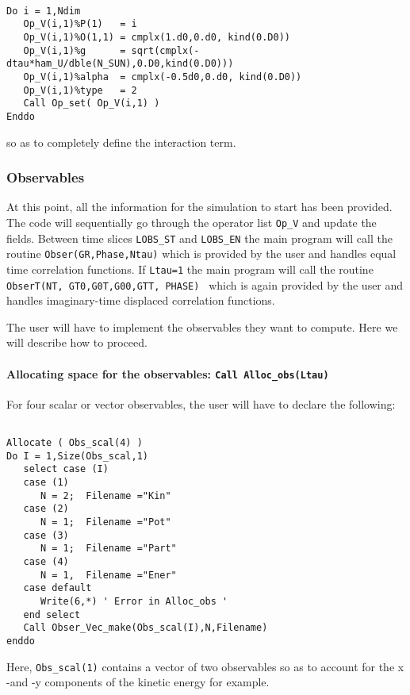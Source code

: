 \begin{lstlisting}

Do i = 1,Ndim
   Op_V(i,1)%P(1)   = i
   Op_V(i,1)%O(1,1) = cmplx(1.d0,0.d0, kind(0.D0))
   Op_V(i,1)%g      = sqrt(cmplx(-dtau*ham_U/dble(N_SUN),0.D0,kind(0.D0)))
   Op_V(i,1)%alpha  = cmplx(-0.5d0,0.d0, kind(0.D0))
   Op_V(i,1)%type   = 2
   Call Op_set( Op_V(i,1) )
Enddo

\end{lstlisting}
so as to completely define the interaction term. 


\subsubsection{Observables}

At this point, all the information   for the simulation to  start has been provided.  The code will sequentially go through  the operator list  \texttt{Op\_V}  and update the  fields.   Between  time slices   \texttt{LOBS\_ST}  and  \texttt{LOBS\_EN}   the main program will call the routine  \texttt{Obser(GR,Phase,Ntau)}   which is provided by the user and handles equal time correlation functions. 
If \texttt{Ltau=1} the main program will call the routine \texttt{ObserT(NT,  GT0,G0T,G00,GTT, PHASE) }   which is again  provided by the user and handles  imaginary-time displaced correlation functions. 

The user will have to  implement the  observables  they  want to compute. Here  we  will describe how to  proceed. 

\paragraph{Allocating space for the observables: \texttt{Call Alloc\_obs(Ltau) }} \label{Alloc_obs_sec}

For  four scalar  or vector observables,  the user will have to  declare the following: 
\begin{lstlisting}

Allocate ( Obs_scal(4) )
Do I = 1,Size(Obs_scal,1)
   select case (I)
   case (1)
      N = 2;  Filename ="Kin"
   case (2)
      N = 1;  Filename ="Pot"
   case (3)
      N = 1;  Filename ="Part"
   case (4)
      N = 1,  Filename ="Ener"
   case default
      Write(6,*) ' Error in Alloc_obs '  
   end select
   Call Obser_Vec_make(Obs_scal(I),N,Filename)
enddo
\end{lstlisting}
Here,   \texttt{Obs\_scal(1)}   contains a vector  of two observables  so as to account for the x -and -y components of the kinetic energy for example.  

